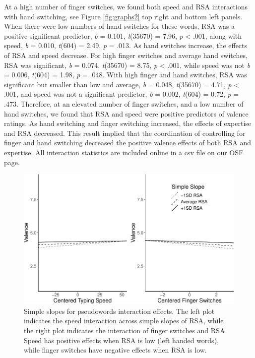 \documentclass[
  english,
  man,mask]{apa7}
\begin{document}
At a high number of finger switches, we found both speed and RSA interactions with hand switching, see Figure \ref{fig:graphs2} top right and bottom left panels. When there were low numbers of hand switches for these words, RSA was a positive significant predictor, \emph{b} = 0.101, \emph{t}(35670) = 7.96, \emph{p} \textless{} .001, along with speed, \emph{b} = 0.010, \emph{t}(604) = 2.49, \emph{p} = .013. As hand switches increase, the effects of RSA and speed decrease. For high finger switches and average hand switches, RSA was significant, \emph{b} = 0.074, \emph{t}(35670) = 8.75, \emph{p} \textless{} .001, while speed was not \emph{b} = 0.006, \emph{t}(604) = 1.98, \emph{p} = .048. With high finger and hand switches, RSA was significant but smaller than low and average, \emph{b} = 0.048, \emph{t}(35670) = 4.71, \emph{p} \textless{} .001, and speed was not a significant predictor, \emph{b} = 0.002, \emph{t}(604) = 0.72, \emph{p} = .473. Therefore, at an elevated number of finger switches, and a low number of hand switches, we found that RSA and speed were positive predictors of valence ratings. As hand switching and finger switching increased, the effects of expertise and RSA decreased. This result implied that the coordination of controlling for finger and hand switching decreased the positive valence effects of both RSA and expertise. All interaction statistics are included online in a csv file on our OSF page.

\begin{figure}
\centering
\includegraphics{QWERTY_files/figure-latex/graphs-1.pdf}
\caption{\label{fig:graphs}Simple slopes for pseudowords interaction effects. The left plot indicates the speed interaction across simple slopes of RSA, while the right plot indicates the interaction of finger switches and RSA. Speed has positive effects when RSA is low (left handed words), while finger switches have negative effects when RSA is low.}
\end{figure}
\end{document}
